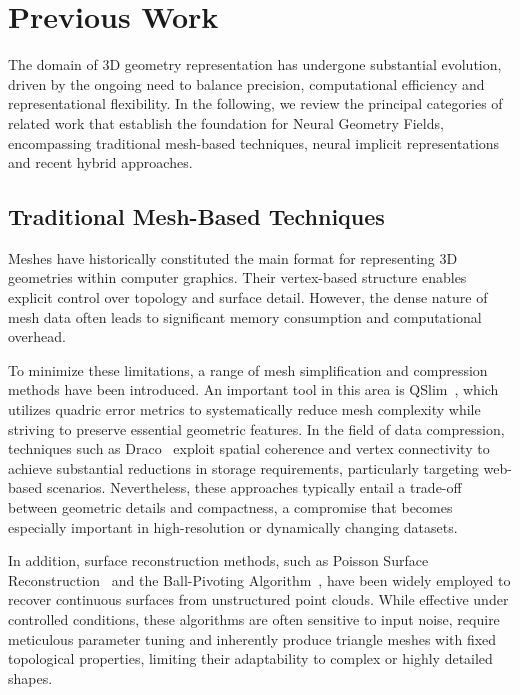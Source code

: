 \section{Previous Work}\label{sec:PreviousWork}

The domain of 3D geometry representation has undergone substantial evolution, driven by the ongoing need to balance precision, computational efficiency and representational flexibility.  
In the following, we review the principal categories of related work that establish the foundation for Neural Geometry Fields, encompassing traditional mesh-based techniques, neural implicit representations and recent hybrid approaches.  

\subsection{Traditional Mesh-Based Techniques}

Meshes have historically constituted the main format for representing 3D geometries within computer graphics.  
Their vertex-based structure enables explicit control over topology and surface detail.  
However, the dense nature of mesh data often leads to significant memory consumption and computational overhead.  

To minimize these limitations, a range of mesh simplification and compression methods have been introduced.  
An important tool in this area is QSlim~\cite{garland1997}, which utilizes quadric error metrics to systematically reduce mesh complexity while striving to preserve essential geometric features.  
In the field of data compression, techniques such as Draco~\cite{sajnani2020} exploit spatial coherence and vertex connectivity to achieve substantial reductions in storage requirements, particularly targeting web-based scenarios.  
Nevertheless, these approaches typically entail a trade-off between geometric details and compactness, a compromise that becomes especially important in high-resolution or dynamically changing datasets.  

In addition, surface reconstruction methods, such as Poisson Surface Reconstruction~\cite{kazhdan2006} and the Ball-Pivoting Algorithm~\cite{bernardini1999}, have been widely employed to recover continuous surfaces from unstructured point clouds.  
While effective under controlled conditions, these algorithms are often sensitive to input noise, require meticulous parameter tuning and inherently produce triangle meshes with fixed topological properties, limiting their adaptability to complex or highly detailed shapes.  

